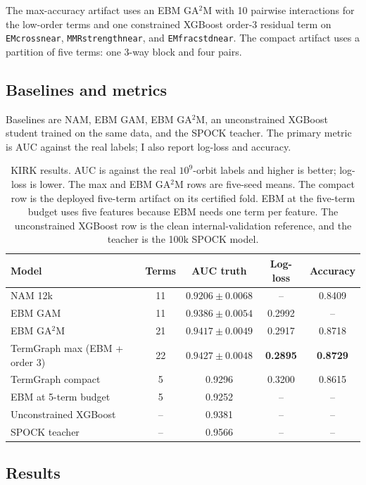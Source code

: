 \documentclass[twoside,11pt]{article}
\begin{document}
The max-accuracy artifact uses an EBM GA$^2$M with 10 pairwise interactions for
the low-order terms and one constrained XGBoost order-3 residual term on
\texttt{EMcrossnear}, \texttt{MMRstrengthnear}, and \texttt{EMfracstdnear}. The
compact artifact uses a partition of five terms: one 3-way block and four pairs.

\subsection{Baselines and metrics}

Baselines are NAM, EBM GAM, EBM GA$^2$M, an unconstrained XGBoost student trained
on the same data, and the SPOCK teacher. The primary metric is AUC against the
real labels; I also report log-loss and accuracy.

\begin{table}[t]
\centering
\normalsize
\setlength{\tabcolsep}{3.5pt}
\begin{tabular}{@{}lcccc@{}}
\toprule
Model & Terms & AUC truth & Log-loss & Accuracy \\
\midrule
NAM 12k & 11 & $0.9206\pm0.0068$ & -- & 0.8409 \\
EBM GAM & 11 & $0.9386\pm0.0054$ & 0.2992 & -- \\
EBM GA$^2$M & 21 & $0.9417\pm0.0049$ & 0.2917 & 0.8718 \\
TermGraph max (EBM + order 3) & 22 & $\mathbf{0.9427\pm0.0048}$ & \textbf{0.2895} & \textbf{0.8729} \\
TermGraph compact & 5 & 0.9296 & 0.3200 & 0.8615 \\
EBM at 5-term budget & 5 & 0.9252 & -- & -- \\
Unconstrained XGBoost & -- & 0.9381 & -- & -- \\
SPOCK teacher & -- & 0.9566 & -- & -- \\
\bottomrule
\end{tabular}
\caption{KIRK results. AUC is against the real $10^9$-orbit labels and higher is
better; log-loss is lower. The max and EBM GA$^2$M rows are five-seed means. The compact row is
the deployed five-term artifact on its certified fold. EBM at the five-term
budget uses five features because EBM needs one term per feature. The
unconstrained XGBoost row is the clean internal-validation reference, and the
teacher is the 100k SPOCK model.}
\label{tab:kirk}
\end{table}

\subsection{Results}
\end{document}
